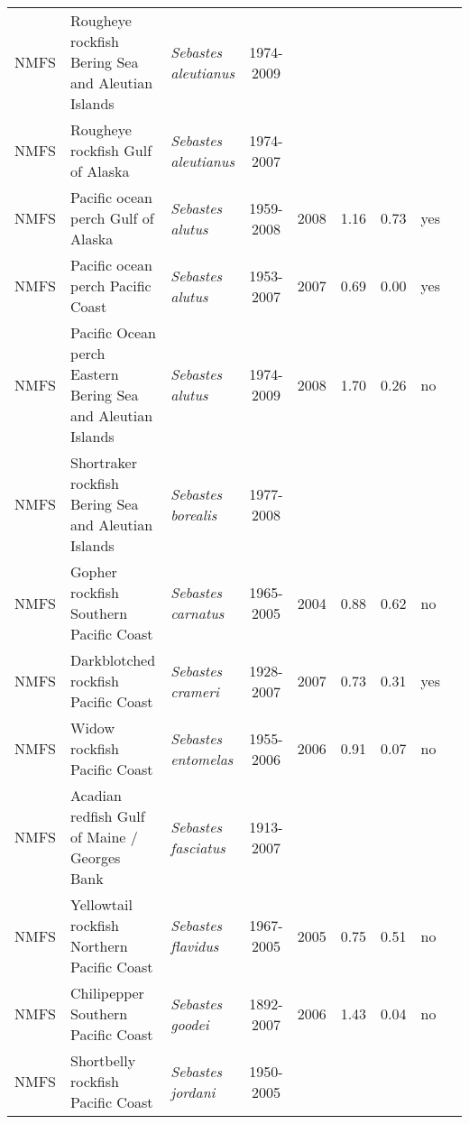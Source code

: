 \begin{longtable}{p{1.8cm}p{4cm}p{4cm}ccccp{1.9cm}c}
  NMFS & Rougheye rockfish Bering Sea and Aleutian Islands & \textit{Sebastes aleutianus} & 1974-2009 &  &  &  &  & \cite{2008 SAFE BSAIrougheye.pdf} \\ 
  NMFS & Rougheye rockfish Gulf of Alaska & \textit{Sebastes aleutianus} & 1974-2007 &  &  &  &  & \cite{AFSC-RYEROCKGA-2008-Rougheye rockfish GA.pdf} \\ 
  NMFS & Pacific ocean perch Gulf of Alaska & \textit{Sebastes alutus} & 1959-2008 & 2008 & 1.16 & 0.73 & yes & \cite{AFSC-POPERCHGA-2008-Pacific ocean perch GA.pdf} \\ 
  NMFS & Pacific ocean perch Pacific Coast & \textit{Sebastes alutus} & 1953-2007 & 2007 & 0.69 & 0.00 & yes & \cite{NWFSC-POPERCHPCOAST-2007-Pacific ocean perch.pdf} \\ 
  NMFS & Pacific Ocean perch Eastern Bering Sea and Aleutian Islands & \textit{Sebastes alutus} & 1974-2009 & 2008 & 1.70 & 0.26 & no & \cite{2008_SAFE_BSAIpop.pdf} \\ 
  NMFS & Shortraker rockfish Bering Sea and Aleutian Islands & \textit{Sebastes borealis} & 1977-2008 &  &  &  &  & \cite{2008_SAFE_BSAIshortraker.pdf} \\ 
  NMFS & Gopher rockfish Southern Pacific Coast & \textit{Sebastes carnatus} & 1965-2005 & 2004 & 0.88 & 0.62 & no & \cite{2005-SAFE-Wcgopher.pdf} \\ 
  NMFS & Darkblotched rockfish Pacific Coast & \textit{Sebastes crameri} & 1928-2007 & 2007 & 0.73 & 0.31 & yes & \cite{NWFSC-DKROCKPCOAST-2008-Darkblotched rockfish.pdf} \\ 
  NMFS & Widow rockfish Pacific Coast & \textit{Sebastes entomelas} & 1955-2006 & 2006 & 0.91 & 0.07 & no & \cite{NWFSC-WROCKPCOAST-2007-widow.pdf} \\ 
  NMFS & Acadian redfish Gulf of Maine / Georges Bank & \textit{Sebastes fasciatus} & 1913-2007 &  &  &  &  & \cite{AcadianRedfish2008.pdf} \\ 
  NMFS & Yellowtail rockfish Northern Pacific Coast & \textit{Sebastes flavidus} & 1967-2005 & 2005 & 0.75 & 0.51 & no & \cite{2005_SAFE_yellowtail.pdf} \\ 
  NMFS & Chilipepper Southern Pacific Coast & \textit{Sebastes goodei} & 1892-2007 & 2006 & 1.43 & 0.04 & no & \cite{NWFSC-CHILISPCOAST-2007-Chilipepper CA OR.pdf} \\ 
  NMFS & Shortbelly rockfish Pacific Coast & \textit{Sebastes jordani} & 1950-2005 &  &  &  &  & \cite{SWFSC-SBELLYROCKPCOAST-2007-Shortbelly rockfish.pdf} \\ 

\end{longtable}
